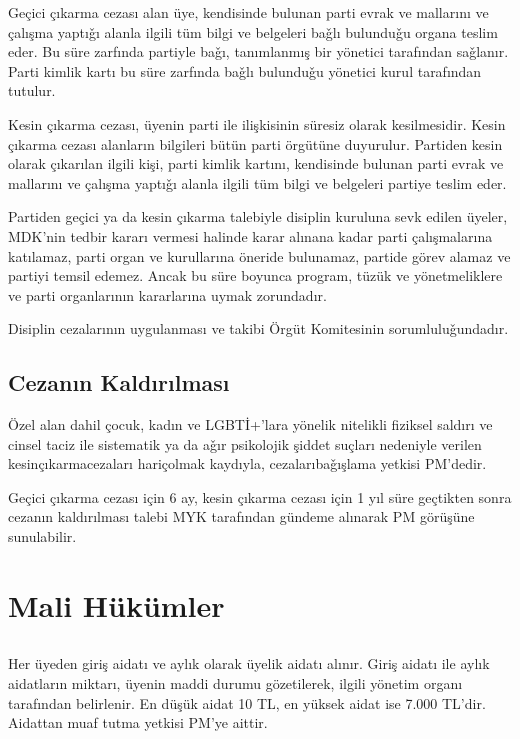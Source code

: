 \documentclass[11pt]{article} %
\begin{document}
Geçici çıkarma cezası alan üye, kendisinde bulunan parti evrak ve mallarını ve çalışma yaptıǧı alanla ilgili tüm bilgi ve belgeleri baǧlı bulunduǧu organa teslim eder. Bu süre zarfında partiyle baǧı, tanımlanmış bir yönetici tarafından saǧlanır. Parti kimlik kartı bu süre zarfında baǧlı bulunduǧu yönetici kurul tarafından tutulur.

Kesin çıkarma cezası, üyenin parti ile ilişkisinin süresiz olarak kesilmesidir. Kesin çıkarma cezası alanların bilgileri bütün parti örgütüne duyurulur. Partiden kesin olarak çıkarılan ilgili kişi, parti kimlik kartını, kendisinde bulunan parti evrak ve mallarını ve çalışma yaptıǧı alanla ilgili tüm bilgi ve belgeleri partiye teslim eder.

Partiden geçici ya da kesin çıkarma talebiyle disiplin kuruluna sevk edilen üyeler, MDK’nin tedbir kararı vermesi halinde karar alınana kadar parti çalışmalarına katılamaz, parti organ ve kurullarına öneride bulunamaz, partide görev alamaz ve partiyi temsil edemez. Ancak bu süre boyunca program, tüzük ve yönetmeliklere ve parti organlarının kararlarına uymak zorundadır.

Disiplin cezalarının uygulanması ve takibi Örgüt Komitesinin sorumluluǧundadır.

\subsection{Cezanın Kaldırılması}
Özel alan dahil çocuk, kadın ve LGBTİ+’lara yönelik nitelikli fiziksel saldırı ve cinsel taciz ile sistematik ya da aǧır psikolojik şiddet suçları nedeniyle verilen kesinçıkarmacezaları hariçolmak kaydıyla, cezalarıbaǧışlama yetkisi PM’dedir.

Geçici çıkarma cezası için 6 ay, kesin çıkarma cezası için 1 yıl süre geçtikten sonra cezanın kaldırılması talebi MYK tarafından gündeme alınarak PM görüşüne sunulabilir.

\section{Mali Hükümler}

\subsection{}
Her üyeden giriş aidatı ve aylık olarak üyelik aidatı alınır. Giriş aidatı ile aylık aidatların miktarı, üyenin maddi durumu gözetilerek, ilgili yönetim organı tarafından belirlenir. En düşük aidat 10 TL, en yüksek aidat ise 7.000 TL’dir. Aidattan muaf tutma yetkisi PM’ye aittir.
\end{document}
